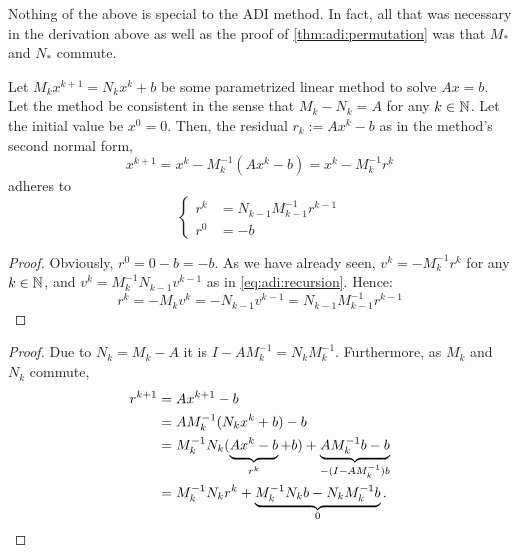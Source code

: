 Nothing of the above is special to the \ac{ADI} method.
In fact, all that was necessary in the derivation above as well as the proof of \autoref{thm:adi:permutation} was that $M_*$ and $N_*$ commute.

\begin{corollary}
  Let $M_k x^{k+1} = N_k x^k + b$ be some parametrized linear method to solve $Ax=b$.
  Let the method be consistent in the sense that $M_k - N_k = A$ for any $k\in\mathbb{N}$.
  Let the initial value be $x^0=0$.
  Then, the residual $r_k := Ax^k - b$ as in the method's second normal form,
  \begin{equation*}
    x^{k+1} = x^k - M_k^{-1} (Ax^k - b) = x^k - M_k^{-1} r^k
  \end{equation*}
  adheres to
  \begin{equation*}
  \left\{
  \begin{aligned}
    r^k &= N_{k-1} M_{k-1}^{-1} r^{k-1} \\
    r^0 &= -b
  \end{aligned}
  \right.
  \end{equation*}
\end{corollary}
\begin{proof}
  Obviously, $r^0 = 0-b = -b$.
  As we have already seen, $v^k = -M_k^{-1} r^k$ for any $k\in\mathbb{N}$,
  and $v^k = M_k^{-1} N_{k-1} v^{k-1}$ as in \eqref{eq:adi:recursion}.
  Hence:
  \begin{equation*}
    r^k
    = -M_k v^k
    = -N_{k-1} v^{k-1}
    = N_{k-1} M_{k-1}^{-1} r^{k-1}
  \end{equation*}
\end{proof}


\begin{proof}
  Due to $N_k = M_k - A$ it is $I - AM_k^{-1} = N_k M_k^{-1}$.
  Furthermore, as $M_k$ and $N_k$ commute,
  \begin{align*}
    r^{k+1}
    &= Ax^{k+1} - b \\
    &= A M_k^{-1} (N_k x^k + b) - b \\
    &= M_k^{-1} N_k (\underbrace{
      \vphantom{M_k^{-1}}
      Ax^k - b
    }_{
      \vphantom{M_k^{-1}}
      r^k
    } + b) + \underbrace{
      A M_k^{-1} b - b
    }_{
      -(I - AM_k^{-1})b
    }\\
    &= M_k^{-1} N_k r^k + \underbrace{
      M_k^{-1} N_k b - N_k M_k^{-1} b
    }_0
    .
  \end{align*}
\end{proof}

